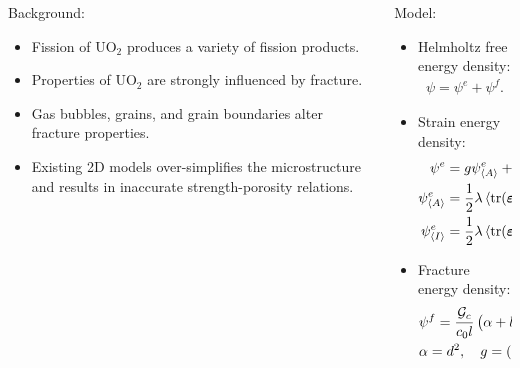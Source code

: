 \begin{frame}
\begin{columns}[T]
\begin{column}{0.5\textwidth}
      Background:
      \begin{itemize}
        \item Fission of UO$_2$ produces a variety of fission products.
        \item Properties of UO$_2$ are strongly influenced by fracture.
        \item Gas bubbles, grains, and grain boundaries alter fracture properties.
        \item Existing 2D models over-simplifies the microstructure and results in inaccurate strength-porosity relations.
      \end{itemize}
    \end{column}
    \pause
    \begin{column}{0.5\textwidth}
      Model:
      \begin{itemize}
        \item Helmholtz free energy density:
              \begin{align*}
                \psi = \psi^e + \psi^f.
              \end{align*}
        \item Strain energy density:
              \begin{align*}
                \psi^e               & = g \psi^e_{\left< A \right>} + \psi^e_{\left< I \right>},                              \\
                \psi^e_{\left< A \right>}   & = \dfrac{1}{2} \lambda \left<\operatorname{tr}(\boldsymbol{\varepsilon})\right>_+^2 + G \boldsymbol{\varepsilon}^+:\boldsymbol{\varepsilon}^+, \\
                \psi^e_{\left< I \right>} & = \dfrac{1}{2} \lambda \left<\operatorname{tr}(\boldsymbol{\varepsilon})\right>_-^2 + G \boldsymbol{\varepsilon}^-:\boldsymbol{\varepsilon}^-, 
              \end{align*}
        \item Fracture energy density:
              \begin{align*}
                 & \psi^f = \dfrac{{\mathcal{G}_c}}{c_0 l}\left( \alpha + l^2 \boldsymbol{\nabla} d \cdot \boldsymbol{\nabla} d \right), \\
                 & \alpha = d^2, \quad g = (1-d)^2.                                              
              \end{align*}
      \end{itemize}
    \end{column}
  \end{columns}
\end{frame}

